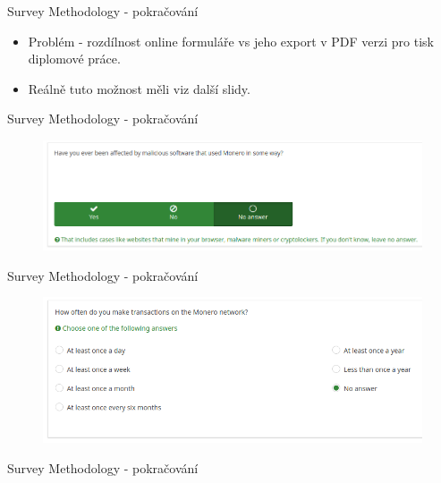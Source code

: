 \documentclass{beamer}
\begin{document}
\begin{darkframes}
\begin{frame}{Survey Methodology - pokračování}


\begin{itemize}
\item Problém - rozdílnost online formuláře vs jeho export v PDF verzi pro tisk diplomové práce.
\item Reálně tuto možnost měli viz další slidy.
\end{itemize}
    \end{frame}
        \begin{frame}{Survey Methodology - pokračování}
     	\begin{figure}
  \centering
  \includegraphics[width=1\textwidth]{survey-answer.png}
\end{figure}
    \end{frame}
            \begin{frame}{Survey Methodology - pokračování}
     	\begin{figure}
  \centering
  \includegraphics[width=1\textwidth]{survey-answernext.png}
\end{figure}
    \end{frame}
            \begin{frame}{Survey Methodology - pokračování}
     	\begin{figure}

\end{figure}
\end{frame}
\end{darkframes}
\end{document}
